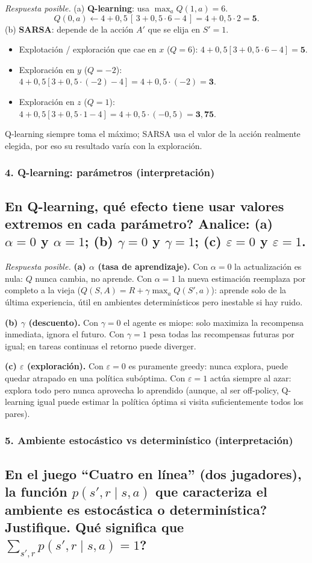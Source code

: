 \documentclass[11pt, a4paper]{article}
\newcommand{\pregunta}[1]{\subsection{#1}}
\newcommand{\eje}[1]{\subsubsection{#1}}
\begin{document}
\begin{respuesta}
\textit{Respuesta posible.} (a) \textbf{Q-learning}: usa $\max_a Q(1,a)=6$.
\[
Q(0,a) \leftarrow 4 + 0{,}5\,[\,3 + 0{,}5\cdot 6 - 4\,] = 4 + 0{,}5\cdot 2 = \mathbf{5}.
\]
(b) \textbf{SARSA}: depende de la acci\'on $A'$ que se elija en $S'=1$.
\begin{itemize}[nosep]
\item Explotaci\'on / exploraci\'on que cae en $x$ ($Q=6$): $4+0{,}5[3+0{,}5\cdot6-4]=\mathbf{5}$.
\item Exploraci\'on en $y$ ($Q=-2$): $4+0{,}5[3+0{,}5\cdot(-2)-4]=4+0{,}5\cdot(-2)=\mathbf{3}$.
\item Exploraci\'on en $z$ ($Q=1$): $4+0{,}5[3+0{,}5\cdot1-4]=4+0{,}5\cdot(-0{,}5)=\mathbf{3{,}75}$.
\end{itemize}
Q-learning siempre toma el m\'aximo; SARSA usa el valor de la acci\'on realmente elegida, por eso su resultado var\'ia con la exploraci\'on.
\end{respuesta}

\eje{4. Q-learning: par\'ametros (interpretaci\'on)}
\pregunta{En Q-learning, \textquestiondown qu\'e efecto tiene usar valores extremos en cada par\'ametro? Analice: (a) $\alpha=0$ y $\alpha=1$; (b) $\gamma=0$ y $\gamma=1$; (c) $\varepsilon=0$ y $\varepsilon=1$.}

\begin{respuesta}
\textit{Respuesta posible.}
\textbf{(a) $\alpha$ (tasa de aprendizaje).} Con $\alpha=0$ la actualizaci\'on es nula: $Q$ nunca cambia, no aprende. Con $\alpha=1$ la nueva estimaci\'on reemplaza por completo a la vieja ($Q(S,A)=R+\gamma\max_a Q(S',a)$): aprende solo de la \'ultima experiencia, \'util en ambientes determin\'isticos pero inestable si hay ruido.

\textbf{(b) $\gamma$ (descuento).} Con $\gamma=0$ el agente es miope: solo maximiza la recompensa inmediata, ignora el futuro. Con $\gamma=1$ pesa todas las recompensas futuras por igual; en tareas continuas el retorno puede diverger.

\textbf{(c) $\varepsilon$ (exploraci\'on).} Con $\varepsilon=0$ es puramente greedy: nunca explora, puede quedar atrapado en una pol\'itica sub\'optima. Con $\varepsilon=1$ act\'ua siempre al azar: explora todo pero nunca aprovecha lo aprendido (aunque, al ser off-policy, Q-learning igual puede estimar la pol\'itica \'optima si visita suficientemente todos los pares).
\end{respuesta}

\eje{5. Ambiente estoc\'astico vs determin\'istico (interpretaci\'on)}
\pregunta{En el juego ``Cuatro en l\'inea'' (dos jugadores), \textquestiondown la funci\'on $p(s',r\mid s,a)$ que caracteriza el ambiente es estoc\'astica o determin\'istica? Justifique. \textquestiondown Qu\'e significa que $\sum_{s',r} p(s',r\mid s,a)=1$?}
\end{document}
